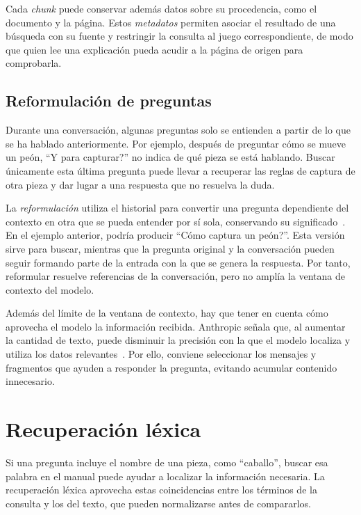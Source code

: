 Cada \textit{chunk} puede conservar además datos sobre su procedencia, como el
documento y la página. Estos \textit{metadatos} permiten asociar el resultado
de una búsqueda con su fuente y restringir la consulta al juego
correspondiente, de modo que quien lee una explicación pueda acudir a la página
de origen para comprobarla.

\FloatBarrier

\subsection{Reformulación de preguntas}

Durante una conversación, algunas preguntas solo se entienden a partir de lo
que se ha hablado anteriormente. Por ejemplo, después de preguntar cómo se
mueve un peón, \enquote{\textquestiondown{}Y para capturar?} no indica de qué
pieza se está hablando. Buscar únicamente esta última pregunta puede llevar a
recuperar las reglas de captura de otra pieza y dar lugar a una respuesta que
no resuelva la duda.

La \textit{reformulación} utiliza el historial para convertir una pregunta
dependiente del contexto en otra que se pueda entender por sí sola, conservando
su significado~\cite{elgohary2019rewrite}. En el ejemplo anterior, podría
producir \enquote{\textquestiondown{}Cómo captura un peón?}. Esta
versión sirve para buscar, mientras que la pregunta original y la conversación
pueden seguir formando parte de la entrada con la que se genera la respuesta.
Por tanto, reformular resuelve referencias de la conversación, pero no amplía
la ventana de contexto del modelo.

Además del límite de la ventana de contexto, hay que tener en cuenta cómo
aprovecha el modelo la información recibida. Anthropic señala que, al
aumentar la cantidad de texto, puede disminuir la precisión con la que
el modelo localiza y utiliza los datos relevantes~\cite{anthropic2025contexto}.
Por ello, conviene seleccionar los mensajes y fragmentos que ayuden a
responder la pregunta, evitando acumular contenido innecesario.

\section{Recuperación léxica}

Si una pregunta incluye el nombre de una pieza, como \enquote{caballo}, buscar
esa palabra en el manual puede ayudar a localizar la información necesaria. La
recuperación léxica aprovecha estas coincidencias entre los términos de la
consulta y los del texto, que pueden normalizarse antes de compararlos.

